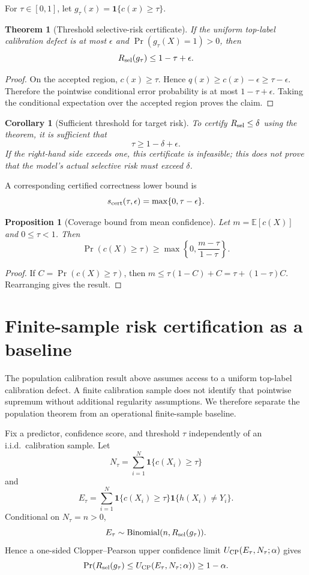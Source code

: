 \documentclass[11pt]{article}
\newtheorem{theorem}{Theorem}
\newtheorem{proposition}{Proposition}
\newtheorem{corollary}{Corollary}
\begin{document}
For $\tau\in[0,1]$, let $g_\tau(x)=\mathbf 1\{c(x)\ge\tau\}$.

\begin{theorem}[Threshold selective-risk certificate]
If the uniform top-label calibration defect is at most $\epsilon$ and
$\Pr(g_\tau(X)=1)>0$, then
\[
R_{\rm sel}(g_\tau)\le 1-\tau+\epsilon.
\]
\end{theorem}

\begin{proof}
On the accepted region, $c(x)\ge\tau$. Hence
$q(x)\ge c(x)-\epsilon\ge\tau-\epsilon$. Therefore the pointwise conditional
error probability is at most $1-\tau+\epsilon$. Taking the conditional
expectation over the accepted region proves the claim.
\end{proof}

\begin{corollary}[Sufficient threshold for target risk]
To certify $R_{\rm sel}\le\delta$ using the theorem, it is sufficient that
\[
\tau\ge 1-\delta+\epsilon.
\]
If the right-hand side exceeds one, this certificate is infeasible; this does
not prove that the model's actual selective risk must exceed $\delta$.
\end{corollary}

A corresponding certified correctness lower bound is
\[
s_{\rm cert}(\tau,\epsilon)=\max\{0,\tau-\epsilon\}.
\]

\begin{proposition}[Coverage bound from mean confidence]
Let $m=\mathbb E[c(X)]$ and $0\le\tau<1$. Then
\[
\Pr(c(X)\ge\tau)
\ge
\max\left\{0,\frac{m-\tau}{1-\tau}\right\}.
\]
\end{proposition}

\begin{proof}
If $C=\Pr(c(X)\ge\tau)$, then
$m\le\tau(1-C)+C=\tau+(1-\tau)C$. Rearranging gives the result.
\end{proof}


\section{Finite-sample risk certification as a baseline}

The population calibration result above assumes access to a uniform
top-label calibration defect. A finite calibration sample does not identify
that pointwise supremum without additional regularity assumptions. We
therefore separate the population theorem from an operational finite-sample
baseline.

Fix a predictor, confidence score, and threshold $\tau$ independently of an
i.i.d.\ calibration sample. Let
\[
N_\tau=\sum_{i=1}^N \mathbf 1\{c(X_i)\ge\tau\}
\]
and
\[
E_\tau=\sum_{i=1}^N
\mathbf 1\{c(X_i)\ge\tau\}\mathbf 1\{h(X_i)\neq Y_i\}.
\]
Conditional on $N_\tau=n>0$,
\[
E_\tau\sim\mathrm{Binomial}(n,R_{\rm sel}(g_\tau)).
\]
Hence a one-sided Clopper--Pearson upper confidence limit
$U_{\rm CP}(E_\tau,N_\tau;\alpha)$ gives
\[
\Pr\!\left(
R_{\rm sel}(g_\tau)
\le
U_{\rm CP}(E_\tau,N_\tau;\alpha)
\right)
\ge 1-\alpha.
\]
\end{document}
